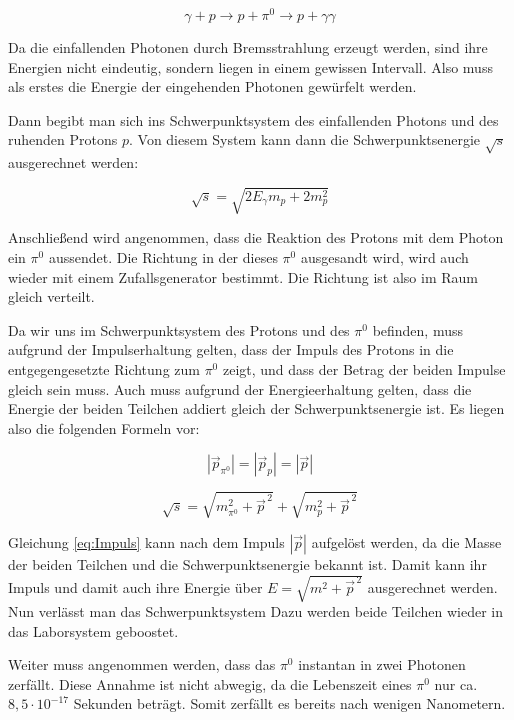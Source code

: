 \documentclass[a4paper,11pt,oneside,final,german,openbib,pdftex]{scrbook}
\begin{document}
{\begin{equation}
\gamma + p \rightarrow p + \pi^0 \rightarrow p + \gamma \gamma 
\end{equation}

Da die einfallenden Photonen durch Bremsstrahlung erzeugt werden, sind ihre Energien nicht eindeutig, sondern liegen in einem gewissen Intervall. Also muss als erstes die Energie der eingehenden Photonen gew\"urfelt werden.

Dann begibt man sich ins Schwerpunktsystem des einfallenden Photons und des ruhenden Protons $p$. 
Von diesem System kann dann die Schwerpunktsenergie $\sqrt{s}$ ausgerechnet werden:

\begin{equation}
\sqrt{s}= \sqrt{2E_{\gamma}m_p+2m_p^2}
\end{equation}

Anschlie{\ss}end wird angenommen, dass die Reaktion des Protons mit dem Photon ein $\pi^0$ aussendet. Die Richtung in der dieses $\pi^0$ ausgesandt wird, wird auch wieder mit einem Zufallsgenerator bestimmt. Die Richtung ist also im Raum gleich verteilt.

Da wir uns im Schwerpunktsystem des Protons und des $\pi^0$ befinden, muss aufgrund der Impulserhaltung gelten, dass der Impuls des Protons in die entgegengesetzte Richtung zum $\pi^0$ zeigt, und dass der Betrag der beiden Impulse gleich sein muss. Auch muss aufgrund der Energieerhaltung gelten, dass die Energie der beiden Teilchen addiert gleich der Schwerpunktsenergie ist. Es liegen also die folgenden Formeln vor:


\begin{equation}
|\vec{p}_{\pi^0}|=|\vec{p}_p| = |\vec{p}| 
\end{equation}

\begin{equation}
 \sqrt{s}=\sqrt{m_{\pi^0}^2+\vec{p}^{\,2}} + \sqrt{m_{p}^2+\vec{p}^{\,2}}
\label{eq:Impuls}
\end{equation}


Gleichung \ref{eq:Impuls} kann nach dem Impuls $|\vec{p}|$ aufgel\"ost werden, da die Masse der beiden Teilchen und die Schwerpunktsenergie bekannt ist. Damit kann ihr Impuls und damit auch ihre Energie über $E=\sqrt{m^2+\vec{p}^{\,2}}$ ausgerechnet werden. 
Nun verl\"asst man das Schwerpunktsystem Dazu werden beide Teilchen wieder in das Laborsystem geboostet.

Weiter muss angenommen werden, dass das $\pi^0$ instantan in zwei Photonen zerf\"allt. Diese Annahme ist nicht abwegig, da die Lebenszeit eines $\pi^0$ nur ca. $8,5\cdot10^{-17}$ Sekunden betr\"agt. Somit zerf\"allt es bereits nach wenigen Nanometern.

}
\end{document}
